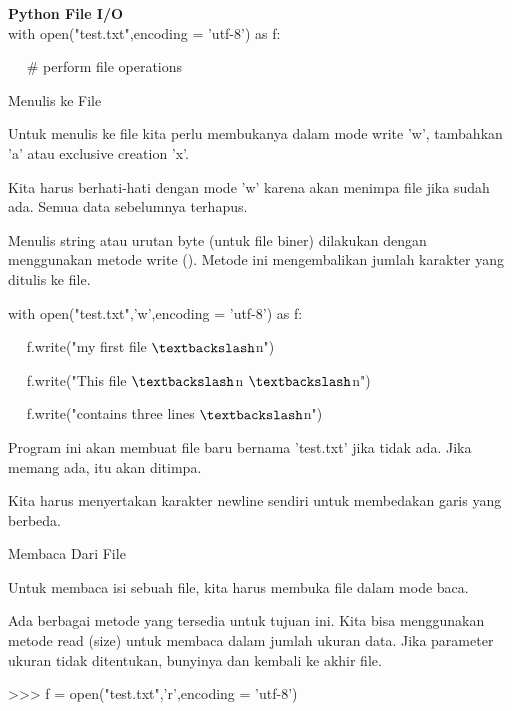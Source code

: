 \begin{center}{\fontsize{24pt}{24pt}\selectfont \textbf{Python File I/O} \\}
with open("test.txt",encoding = 'utf-8') as f:

~~  $  \#  $ perform file operations 
\vspace{12pt}
\vspace{12pt}
\vspace{12pt}
\vspace{12pt}

Menulis ke File 
\vspace{12pt}
 
Untuk menulis ke file kita perlu membukanya dalam mode write 'w', tambahkan 'a' atau exclusive creation 'x'. 
\vspace{12pt}

Kita harus berhati-hati dengan mode 'w' karena akan menimpa file jika sudah ada. Semua data sebelumnya terhapus. 
\vspace{12pt}

Menulis string atau urutan byte (untuk file biner) dilakukan dengan menggunakan metode write (). Metode ini mengembalikan jumlah karakter yang ditulis ke file. 
\vspace{12pt}

with open("test.txt",'w',encoding = 'utf-8') as f: 

~~ f.write("my first file $  \textbackslash  $n") 

~~ f.write("This file $  \textbackslash  $n $  \textbackslash  $n") 

~~ f.write("contains three lines $  \textbackslash  $n") 
\vspace{12pt}

Program ini akan membuat file baru bernama 'test.txt' jika tidak ada. Jika memang ada, itu akan ditimpa. 
\vspace{12pt}

Kita harus menyertakan karakter newline sendiri untuk membedakan garis yang berbeda. 

Membaca Dari File 
\vspace{12pt}

Untuk membaca isi sebuah file, kita harus membuka file dalam mode baca. 
\vspace{12pt}
 
Ada berbagai metode yang tersedia untuk tujuan ini. Kita bisa menggunakan metode read (size) untuk membaca dalam jumlah ukuran data. Jika parameter ukuran tidak ditentukan, bunyinya dan kembali ke akhir file. 
\vspace{12pt}
\vspace{12pt}

>>> f = open("test.txt",'r',encoding = 'utf-8') 


\end{center}
